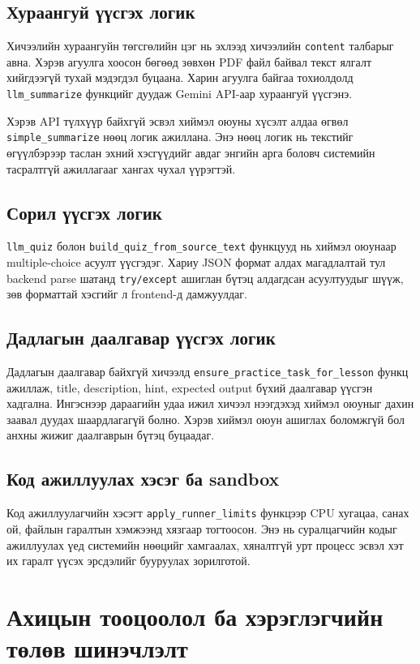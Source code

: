 \subsection{Хураангуй үүсгэх логик}
Хичээлийн хураангуйн төгсгөлийн цэг нь эхлээд хичээлийн \texttt{content} талбарыг авна. Хэрэв агуулга хоосон бөгөөд зөвхөн PDF файл байвал текст ялгалт хийгдээгүй тухай мэдэгдэл буцаана. Харин агуулга байгаа тохиолдолд \texttt{llm\_summarize} функцийг дуудаж Gemini API-аар хураангуй үүсгэнэ.

Хэрэв API түлхүүр байхгүй эсвэл хиймэл оюуны хүсэлт алдаа өгвөл \texttt{simple\_summarize} нөөц логик ажиллана. Энэ нөөц логик нь текстийг өгүүлбэрээр таслан эхний хэсгүүдийг авдаг энгийн арга боловч системийн тасралтгүй ажиллагааг хангах чухал үүрэгтэй.

\subsection{Сорил үүсгэх логик}
\texttt{llm\_quiz} болон \texttt{build\_quiz\_from\_source\_text} функцууд нь хиймэл оюунаар multiple-choice асуулт үүсгэдэг. Хариу JSON формат алдах магадлалтай тул backend parse шатанд \texttt{try/except} ашиглан бүтэц алдагдсан асуултуудыг шүүж, зөв форматтай хэсгийг л frontend-д дамжуулдаг.

\subsection{Дадлагын даалгавар үүсгэх логик}
Дадлагын даалгавар байхгүй хичээлд \texttt{ensure\_practice\_task\_for\_lesson} функц ажиллаж, title, description, hint, expected output бүхий даалгавар үүсгэн хадгална. Ингэснээр дараагийн удаа ижил хичээл нээгдэхэд хиймэл оюуныг дахин заавал дуудах шаардлагагүй болно. Хэрэв хиймэл оюун ашиглах боломжгүй бол анхны жижиг даалгаврын бүтэц буцаадаг.

\subsection{Код ажиллуулах хэсэг ба sandbox}
Код ажиллуулагчийн хэсэгт \texttt{apply\_runner\_limits} функцээр CPU хугацаа, санах ой, файлын гаралтын хэмжээнд хязгаар тогтоосон. Энэ нь суралцагчийн кодыг ажиллуулах үед системийн нөөцийг хамгаалах, хяналтгүй урт процесс эсвэл хэт их гаралт үүсэх эрсдэлийг бууруулах зорилготой.

\section{Ахицын тооцоолол ба хэрэглэгчийн төлөв шинэчлэлт}
